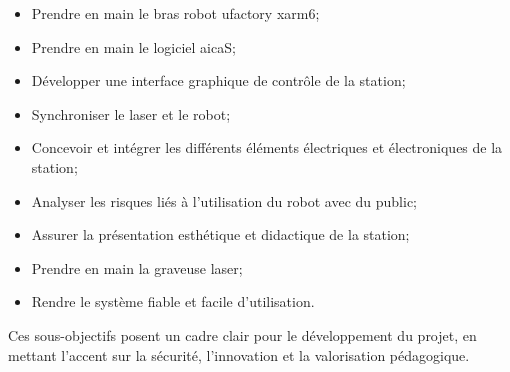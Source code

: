 \begin{itemize}
    \item Prendre en main le bras robot \gls{ufactory} \gls{xarm6};
    \item Prendre en main le logiciel \gls{aicaS};
    \item Développer une interface graphique de contrôle de la station;
    \item Synchroniser le laser et le robot;
    \item Concevoir et intégrer les différents éléments électriques et électroniques de la station;
    \item Analyser les risques liés à l'utilisation du robot avec du public;
    \item Assurer la présentation esthétique et didactique de la station;
    \item Prendre en main la graveuse laser;    \item Rendre le système fiable et facile d'utilisation.
\end{itemize}

Ces sous-objectifs posent un cadre clair pour le développement du projet, en mettant l'accent sur la sécurité, l'innovation et la valorisation pédagogique.


